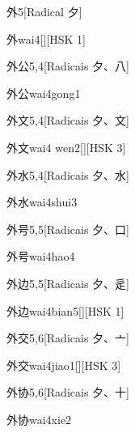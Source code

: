 \begin{entry}{外}{5}[Radical ⼣]
  \begin{phonetics}{外}{wai4}[][HSK 1]
  \end{phonetics}
\end{entry}

\begin{entry}{外公}{5,4}[Radicais ⼣、⼋]
  \begin{phonetics}{外公}{wai4gong1}
  \end{phonetics}
\end{entry}

\begin{entry}{外文}{5,4}[Radicais ⼣、⽂]
  \begin{phonetics}{外文}{wai4 wen2}[][HSK 3]
  \end{phonetics}
\end{entry}

\begin{entry}{外水}{5,4}[Radicais ⼣、⽔]
  \begin{phonetics}{外水}{wai4shui3}
  \end{phonetics}
\end{entry}

\begin{entry}{外号}{5,5}[Radicais ⼣、⼝]
  \begin{phonetics}{外号}{wai4hao4}
  \end{phonetics}
\end{entry}

\begin{entry}{外边}{5,5}[Radicais ⼣、⾡]
  \begin{phonetics}{外边}{wai4bian5}[][HSK 1]
  \end{phonetics}
\end{entry}

\begin{entry}{外交}{5,6}[Radicais ⼣、⼇]
  \begin{phonetics}{外交}{wai4jiao1}[][HSK 3]
  \end{phonetics}
\end{entry}

\begin{entry}{外协}{5,6}[Radicais ⼣、⼗]
  \begin{phonetics}{外协}{wai4xie2}
  \end{phonetics}
\end{entry}

